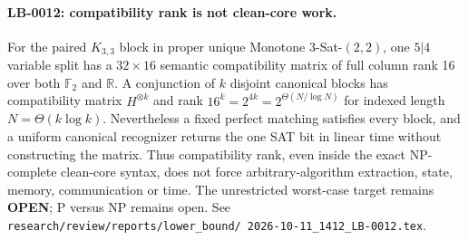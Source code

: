 \paragraph{LB-0012: compatibility rank is not clean-core work.}
For the paired $K_{3,3}$ block in proper unique Monotone
$3$-Sat-$(2,2)$, one $5|4$ variable split has a $32\times16$ semantic
compatibility matrix of full column rank 16 over both $\mathbb F_2$ and
$\mathbb R$.  A conjunction of $k$ disjoint canonical blocks has
compatibility matrix $H^{\otimes k}$ and rank
$16^k=2^{4k}=2^{\Theta(N/\log N)}$ for indexed length
$N=\Theta(k\log k)$.  Nevertheless a fixed perfect matching satisfies every
block, and a uniform canonical recognizer returns the one SAT bit in linear
time without constructing the matrix.  Thus compatibility rank, even inside
the exact NP-complete clean-core syntax, does not force arbitrary-algorithm
extraction, state, memory, communication or time.  The unrestricted
worst-case target remains \textbf{OPEN}; P versus NP remains open.  See
\texttt{research/review/reports/lower\_bound/
2026-10-11\_1412\_LB-0012.tex}.
